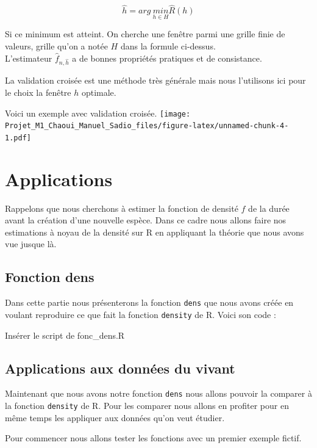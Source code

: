 \documentclass[
]{book}
\begin{document}
\[
\hat{h} = arg\ \underset{h\in H}{min}\hat{R}(h)
\]

Si ce minimum est atteint. On cherche une fenêtre parmi une grille finie de valeurs, grille qu'on a notée \(H\) dans la formule ci-dessus.\\
L'estimateur \(\hat{f}_{n,\hat{h}}\) a de bonnes propriétés pratiques et de consistance.

La validation croisée est une méthode très générale mais nous l'utilisons ici pour le choix la fenêtre \(h\) optimale.

Voici un exemple avec validation croisée.
\texttt{[image: Projet\_M1\_Chaoui\_Manuel\_Sadio\_files/figure-latex/unnamed-chunk-4-1.pdf]}

\hypertarget{applications}{%
\chapter{Applications}\label{applications}}

Rappelons que nous cherchons à estimer la fonction de densité \(f\) de la durée avant la création d'une nouvelle espèce. Dans ce cadre nous allons faire nos estimations à noyau de la densité sur R en appliquant la théorie que nous avons vue jusque là.

\hypertarget{fonction-dens}{%
\section{Fonction dens}\label{fonction-dens}}

Dans cette partie nous présenterons la fonction \texttt{dens} que nous avons créée en voulant reproduire ce que fait la fonction \texttt{density} de R.
Voici son code :

Insérer le script de fonc\_dens.R

\hypertarget{applications-aux-donnuxe9es-du-vivant}{%
\section{Applications aux données du vivant}\label{applications-aux-donnuxe9es-du-vivant}}

Maintenant que nous avons notre fonction \texttt{dens} nous allons pouvoir la comparer à la fonction \texttt{density} de R. Pour les comparer nous allons en profiter pour en même temps les appliquer aux données qu'on veut étudier.

Pour commencer nous allons tester les fonctions avec un premier exemple fictif.
\end{document}
